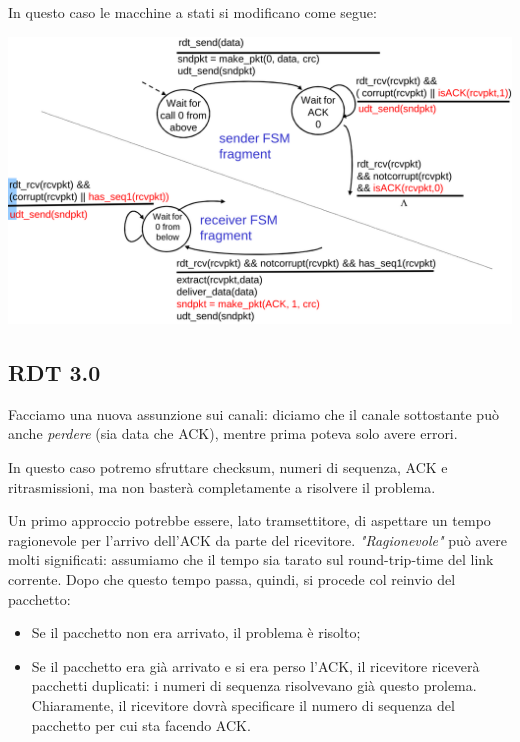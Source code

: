 \documentclass[a4paper,11pt]{article}
\begin{document}
\newpage
In questo caso le macchine a stati si modificano come segue:
\begin{center}
	\includegraphics[scale=0.25]{../figures/rdt22fsm.png}
\end{center}

\subsection{RDT 3.0}
Facciamo una nuova assunzione sui canali: diciamo che il canale sottostante può anche \textit{perdere} (sia data che ACK), mentre prima poteva solo avere errori.

In questo caso potremo sfruttare checksum, numeri di sequenza, ACK e ritrasmissioni, ma non basterà completamente a risolvere il problema.

Un primo approccio potrebbe essere, lato tramsettitore, di aspettare un tempo ragionevole per l'arrivo dell'ACK da parte del ricevitore.
\textit{"Ragionevole"} può avere molti significati: assumiamo che il tempo sia tarato sul round-trip-time del link corrente.
Dopo che questo tempo passa, quindi, si procede col reinvio del pacchetto:
\begin{itemize}
	\item Se il pacchetto non era arrivato, il problema è risolto;
	\item Se il pacchetto era già arrivato e si era perso l'ACK, il ricevitore riceverà pacchetti duplicati: i numeri di sequenza risolvevano già questo prolema. Chiaramente, il ricevitore dovrà specificare il numero di sequenza del pacchetto per cui sta facendo ACK.
\end{itemize}

\newpage
\end{document}
